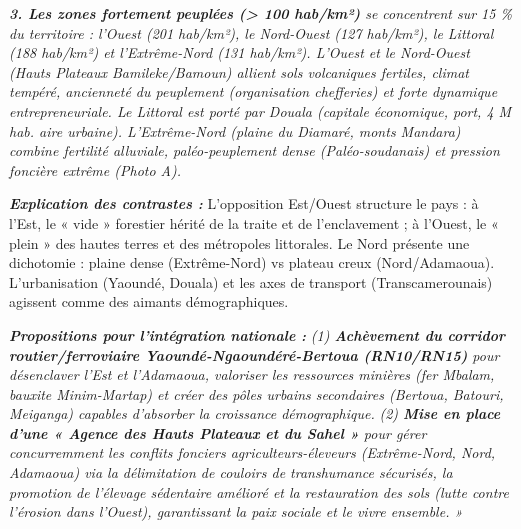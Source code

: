 \documentclass[11pt]{article}
\newcommand{\cle}[1]{{\popxbold\color{popdark}#1}}
\begin{document}
\begin{exoresolu}
\emph{\textbf{3. Les zones fortement peuplées (> 100 hab/km²) }se concentrent sur 15 \% du territoire : l'Ouest (201 hab/km²), le Nord-Ouest (127 hab/km²), le Littoral (188 hab/km²) et l'Extrême-Nord (131 hab/km²). L'Ouest et le Nord-Ouest (Hauts Plateaux Bamileke/Bamoun) allient sols volcaniques fertiles, climat tempéré, ancienneté du peuplement (organisation chefferies) et forte dynamique entrepreneuriale. Le Littoral est porté par Douala (capitale économique, port, 4 M hab. aire urbaine). L'Extrême-Nord (plaine du Diamaré, monts Mandara) combine fertilité alluviale, paléo-peuplement dense (Paléo-soudanais) et pression foncière extrême (Photo A).}

\emph{\textbf{Explication des contrastes :} }L'opposition Est/Ouest structure le pays : à l'Est, le « vide » forestier hérité de la traite et de l'enclavement ; à l'Ouest, le « plein » des hautes terres et des métropoles littorales. Le Nord présente une dichotomie : plaine dense (Extrême-Nord) vs plateau creux (Nord/Adamaoua). L'urbanisation (Yaoundé, Douala) et les axes de transport (Transcamerounais) agissent comme des aimants démographiques.

\emph{\textbf{Propositions pour l'intégration nationale :}}
\emph{(1) \textbf{Achèvement du corridor routier/ferroviaire Yaoundé-Ngaoundéré-Bertoua (RN10/RN15)} pour désenclaver l'Est et l'Adamaoua, valoriser les ressources minières (fer Mbalam, bauxite Minim-Martap) et créer des pôles urbains secondaires (Bertoua, Batouri, Meiganga) capables d'absorber la croissance démographique.}
\emph{(2) \textbf{Mise en place d'une « Agence des Hauts Plateaux et du Sahel »} pour gérer concurremment les conflits fonciers agriculteurs-éleveurs (Extrême-Nord, Nord, Adamaoua) via la délimitation de couloirs de transhumance sécurisés, la promotion de l'élevage sédentaire amélioré et la restauration des sols (lutte contre l'érosion dans l'Ouest), garantissant la paix sociale et le \cle{vivre ensemble}. »}


\end{exoresolu}
\end{document}
